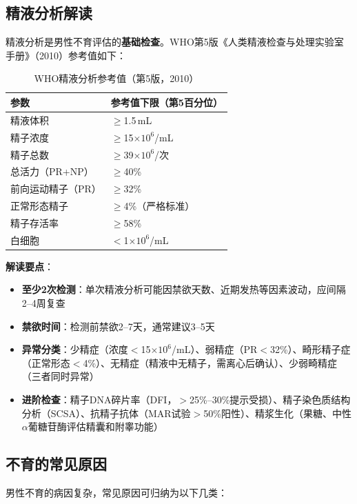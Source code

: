 \subsection{精液分析解读}

精液分析是男性不育评估的\textbf{基础检查}。WHO第5版《人类精液检查与处理实验室手册》（2010）参考值如下：

\begin{table}[htbp]
\centering
\caption{WHO精液分析参考值（第5版，2010）}
\label{tab:semen_analysis_who}
\begin{tabularx}{\textwidth}{@{}lX@{}}
    \toprule
    \textbf{参数} & \textbf{参考值下限（第5百分位）} \\
    \midrule
    精液体积 & $\ge$1.5\,mL \\
    精子浓度 & $\ge$15$\times10^6$/mL \\
    精子总数 & $\ge$39$\times10^6$/次 \\
    总活力（PR+NP） & $\ge$40\% \\
    前向运动精子（PR） & $\ge$32\% \\
    正常形态精子 & $\ge$4\%（严格标准） \\
    精子存活率 & $\ge$58\% \\
    白细胞 & $<$1$\times10^6$/mL \\
    \bottomrule
\end{tabularx}
\end{table}

\textbf{解读要点}：
\begin{itemize}[leftmargin=2cm]
	\item \textbf{至少2次检测}：单次精液分析可能因禁欲天数、近期发热等因素波动，应间隔2--4周复查
	\item \textbf{禁欲时间}：检测前禁欲2--7天，通常建议3--5天
	\item \textbf{异常分类}：少精症（浓度$<$15$\times10^6$/mL）、弱精症（PR$<$32\%）、畸形精子症（正常形态$<$4\%）、无精症（精液中无精子，需离心后确认）、少弱畸精症（三者同时异常）
	\item \textbf{进阶检查}：精子DNA碎片率（DFI，$>$25\%--30\%提示受损）、精子染色质结构分析（SCSA）、抗精子抗体（MAR试验$>$50\%阳性）、精浆生化（果糖、中性$\alpha$葡糖苷酶评估精囊和附睾功能）
\end{itemize}

\subsection{不育的常见原因}

男性不育的病因复杂，常见原因可归纳为以下几类：

